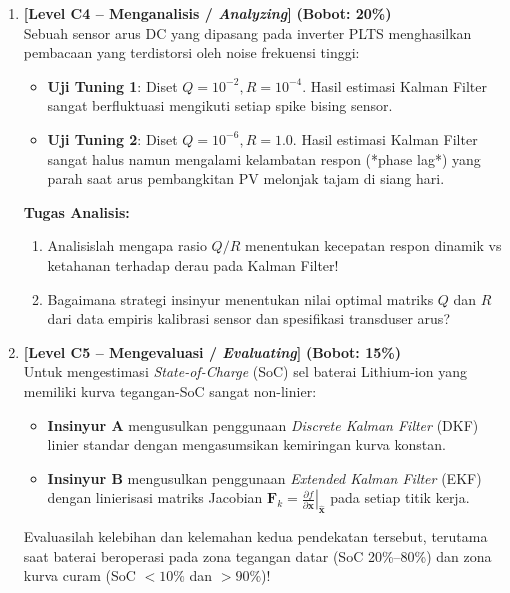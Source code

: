 \documentclass[11pt,a4paper]{article}
\begin{document}
\begin{enumerate}[leftmargin=1.5em, label=\textbf{Soal \arabic*.}]
    \newpage

    \item \textbf{[Level C4 -- Menganalisis / \textit{Analyzing}]} \hfill \textbf{(Bobot: 20\%)} \\
    Sebuah sensor arus DC yang dipasang pada inverter PLTS menghasilkan pembacaan yang terdistorsi oleh noise frekuensi tinggi:
    \begin{itemize}
        \item \textbf{Uji Tuning 1}: Diset $Q = 10^{-2}, R = 10^{-4}$. Hasil estimasi Kalman Filter sangat berfluktuasi mengikuti setiap spike bising sensor.
        \item \textbf{Uji Tuning 2}: Diset $Q = 10^{-6}, R = 1.0$. Hasil estimasi Kalman Filter sangat halus namun mengalami kelambatan respon (*phase lag*) yang parah saat arus pembangkitan PV melonjak tajam di siang hari.
    \end{itemize}
    \textbf{Tugas Analisis:}
    \begin{enumerate}[label=\alph*.]
        \item Analisislah mengapa rasio $Q/R$ menentukan kecepatan respon dinamik vs ketahanan terhadap derau pada Kalman Filter!
        \item Bagaimana strategi insinyur menentukan nilai optimal matriks $Q$ dan $R$ dari data empiris kalibrasi sensor dan spesifikasi transduser arus?
    \end{enumerate}

    \vspace{0.4cm}

    \item \textbf{[Level C5 -- Mengevaluasi / \textit{Evaluating}]} \hfill \textbf{(Bobot: 15\%)} \\
    Untuk mengestimasi \textit{State-of-Charge} (SoC) sel baterai Lithium-ion yang memiliki kurva tegangan-SoC sangat non-linier:
    \begin{itemize}
        \item \textbf{Insinyur A} mengusulkan penggunaan \textit{Discrete Kalman Filter} (DKF) linier standar dengan mengasumsikan kemiringan kurva konstan.
        \item \textbf{Insinyur B} mengusulkan penggunaan \textit{Extended Kalman Filter} (EKF) dengan linierisasi matriks Jacobian $\mathbf{F}_k = \left.\frac{\partial f}{\partial \mathbf{x}}\right|_{\hat{\mathbf{x}}}$ pada setiap titik kerja.
    \end{itemize}
    Evaluasilah kelebihan dan kelemahan kedua pendekatan tersebut, terutama saat baterai beroperasi pada zona tegangan datar (SoC 20\%--80\%) dan zona kurva curam (SoC $<10\%$ dan $>90\%$)!


\end{enumerate}
\end{document}

